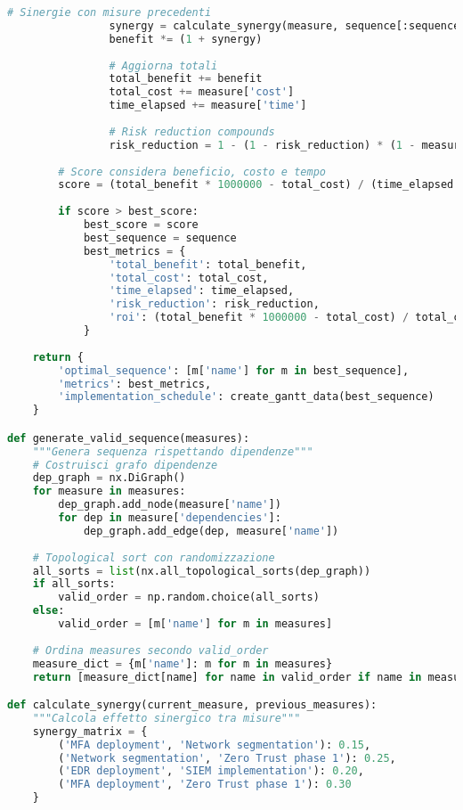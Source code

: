 \begin{lstlisting}[language=Python, caption=Ottimizzazione Sequenza Implementazione Security]
                # Sinergie con misure precedenti
                synergy = calculate_synergy(measure, sequence[:sequence.index(measure)])
                benefit *= (1 + synergy)
                
                # Aggiorna totali
                total_benefit += benefit
                total_cost += measure['cost']
                time_elapsed += measure['time']
                
                # Risk reduction compounds
                risk_reduction = 1 - (1 - risk_reduction) * (1 - measure['security_improvement'])
        
        # Score considera beneficio, costo e tempo
        score = (total_benefit * 1000000 - total_cost) / (time_elapsed + 1)
        
        if score > best_score:
            best_score = score
            best_sequence = sequence
            best_metrics = {
                'total_benefit': total_benefit,
                'total_cost': total_cost,
                'time_elapsed': time_elapsed,
                'risk_reduction': risk_reduction,
                'roi': (total_benefit * 1000000 - total_cost) / total_cost * 100
            }
    
    return {
        'optimal_sequence': [m['name'] for m in best_sequence],
        'metrics': best_metrics,
        'implementation_schedule': create_gantt_data(best_sequence)
    }

def generate_valid_sequence(measures):
    """Genera sequenza rispettando dipendenze"""
    # Costruisci grafo dipendenze
    dep_graph = nx.DiGraph()
    for measure in measures:
        dep_graph.add_node(measure['name'])
        for dep in measure['dependencies']:
            dep_graph.add_edge(dep, measure['name'])
    
    # Topological sort con randomizzazione
    all_sorts = list(nx.all_topological_sorts(dep_graph))
    if all_sorts:
        valid_order = np.random.choice(all_sorts)
    else:
        valid_order = [m['name'] for m in measures]
    
    # Ordina measures secondo valid_order
    measure_dict = {m['name']: m for m in measures}
    return [measure_dict[name] for name in valid_order if name in measure_dict]

def calculate_synergy(current_measure, previous_measures):
    """Calcola effetto sinergico tra misure"""
    synergy_matrix = {
        ('MFA deployment', 'Network segmentation'): 0.15,
        ('Network segmentation', 'Zero Trust phase 1'): 0.25,
        ('EDR deployment', 'SIEM implementation'): 0.20,
        ('MFA deployment', 'Zero Trust phase 1'): 0.30
    }
    

\end{lstlisting}
